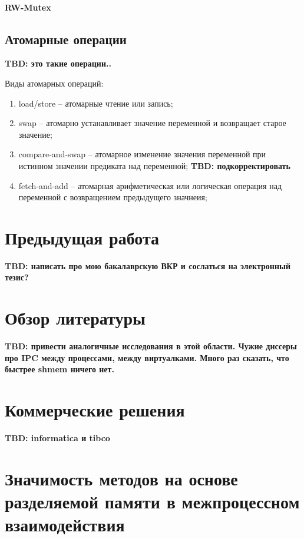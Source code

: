 \paragraph{RW-Mutex}


\subsection{Атомарные операции}

\textbf{TBD: это такие операции..}

Виды атомарных операций:
\begin{enumerate}
\item load/store -- атомарные чтение или запись;
\item swap -- атомарно устанавливает значение переменной и возвращает старое значение;
\item compare-and-swap -- атомарное изменение значения переменной при истинном значении предиката над переменной; \textbf{TBD: подкорректировать}
\item fetch-and-add -- атомарная арифметическая или логическая операция над переменной с возвращением предыдущего значнеия;
\end{enumerate}

\section{Предыдущая работа}

\textbf{TBD: написать про мою бакалаврскую ВКР и сослаться на электронный тезис?}

\section{Обзор литературы}

\textbf{TBD: привести аналогичные исследования в этой области. Чужие диссеры про IPC между процессами, между виртуалками. Много раз сказать, что быстрее shmem ничего нет.}

\section{Коммерческие решения}

\textbf{TBD: informatica и tibco}

\section{Значимость методов на основе разделяемой памяти в межпроцессном взаимодействия}

